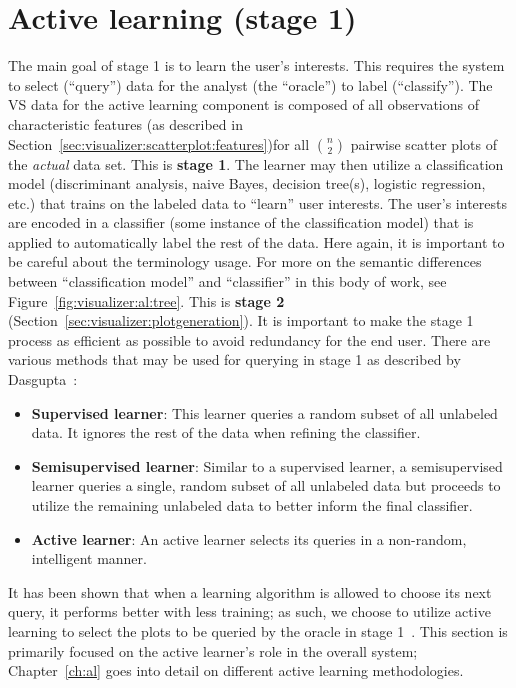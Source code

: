 \section{Active learning (stage 1)}
\label{sec:visualizer:al}

The main goal of stage 1 is to learn the user's interests. This requires the 
system to select (``query'') data for the analyst (the ``oracle'') to label 
(``classify''). The VS data for the active learning component is composed of 
all observations of characteristic features (as described in 
Section~\ref{sec:visualizer:scatterplot:features})for all $n\choose2$ pairwise 
scatter plots of the \textit{actual} data set. This is \textbf{stage 1}. 
The learner may then utilize 
a classification model (discriminant analysis, naive Bayes, decision tree(s), 
logistic regression, etc.) that trains on the labeled data to ``learn'' user 
interests. The user's interests are encoded in a classifier (some instance of 
the classification model) that is applied to automatically label the rest of 
the data. Here again, it is important to be careful about the terminology 
usage. For more on the semantic differences between ``classification model'' 
and ``classifier'' in this body of work, see 
Figure~\ref{fig:visualizer:al:tree}. This is 
\textbf{stage 2} (Section~\ref{sec:visualizer:plotgeneration}). 
It is important to make the stage 1 process as efficient as possible to avoid 
redundancy for the end user. There are various methods that may be used for 
querying in stage 1 as described by Dasgupta~\cite{dasgupta2011}:

\tablespacing
\begin{itemize}
	\item \textbf{Supervised learner}: This learner queries a random 
	subset of all unlabeled data. It ignores the rest of the data when refining 
	the classifier.
	\item \textbf{Semisupervised learner}: Similar to a supervised learner, a 
	semisupervised learner queries a single, random subset of all 
	unlabeled data but proceeds to utilize the remaining unlabeled data to 
	better inform the final classifier.
	\item \textbf{Active learner}: An active learner selects its queries in a 
	non-random, intelligent manner.
\end{itemize}
\bodyspacing

It has been 
shown that when a learning algorithm is allowed to choose its next query, it 
performs better with less training; as such, we choose to utilize active 
learning to select the plots to be queried by the oracle in stage 
1~\cite{settles2010}. This section is primarily focused on the active learner's 
role in the overall system; Chapter~\ref{ch:al} goes into detail on different 
active learning methodologies.

